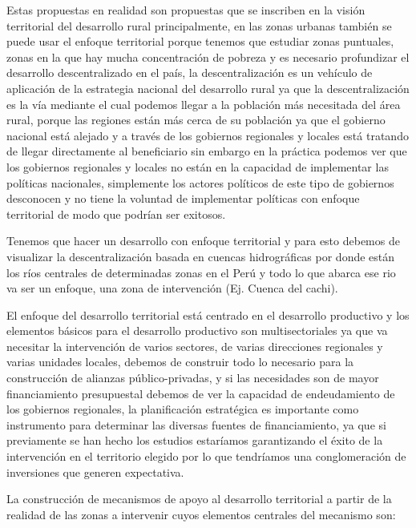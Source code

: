 \documentclass[
  a4paper,
]{article}
\begin{document}
Estas propuestas en realidad son propuestas que se inscriben en la
visión territorial del desarrollo rural principalmente, en las zonas
urbanas también se puede usar el enfoque territorial porque tenemos que
estudiar zonas puntuales, zonas en la que hay mucha concentración de
pobreza y es necesario profundizar el desarrollo descentralizado en el
país, la descentralización es un vehículo de aplicación de la estrategia
nacional del desarrollo rural ya que la descentralización es la vía
mediante el cual podemos llegar a la población más necesitada del área
rural, porque las regiones están más cerca de su población ya que el
gobierno nacional está alejado y a través de los gobiernos regionales y
locales está tratando de llegar directamente al beneficiario sin embargo
en la práctica podemos ver que los gobiernos regionales y locales no
están en la capacidad de implementar las políticas nacionales,
simplemente los actores políticos de este tipo de gobiernos desconocen y
no tiene la voluntad de implementar políticas con enfoque territorial de
modo que podrían ser exitosos.

Tenemos que hacer un desarrollo con enfoque territorial y para esto
debemos de visualizar la descentralización basada en cuencas
hidrográficas por donde están los ríos centrales de determinadas zonas
en el Perú y todo lo que abarca ese rio va ser un enfoque, una zona de
intervención (Ej. Cuenca del cachi).

El enfoque del desarrollo territorial está centrado en el desarrollo
productivo y los elementos básicos para el desarrollo productivo son
multisectoriales ya que va necesitar la intervención de varios sectores,
de varias direcciones regionales y varias unidades locales, debemos de
construir todo lo necesario para la construcción de alianzas
público-privadas, y si las necesidades son de mayor financiamiento
presupuestal debemos de ver la capacidad de endeudamiento de los
gobiernos regionales, la planificación estratégica es importante como
instrumento para determinar las diversas fuentes de financiamiento, ya
que si previamente se han hecho los estudios estaríamos garantizando el
éxito de la intervención en el territorio elegido por lo que tendríamos
una conglomeración de inversiones que generen expectativa.

La construcción de mecanismos de apoyo al desarrollo territorial a
partir de la realidad de las zonas a intervenir cuyos elementos
centrales del mecanismo son:
\end{document}

